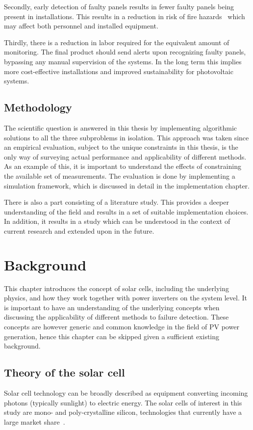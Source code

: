 Secondly, early detection of faulty panels results in fewer faulty panels being present in installations.
This results in a reduction in risk of fire hazards~\cite{Zhao2010night} which may affect both personnel and installed equipment.

Thirdly, there is a reduction in labor required for the equivalent amount of monitoring.
The final product should send alerts upon recognizing faulty panels, bypassing any manual supervision of the systems.
In the long term this implies more cost-effective installations and improved sustainability for photovoltaic systems.

\section{Methodology}
The scientific question is answered in this thesis by implementing algorithmic solutions to all the three subproblems in isolation.
This approach was taken since an empirical evaluation, subject to the unique constraints in this thesis, is the only way of surveying actual performance and applicability of different methods.
As an example of this, it is important to understand the effects of constraining the available set of measurements.
The evaluation is done by implementing a simulation framework, which is discussed in detail in the implementation chapter.

There is also a part consisting of a literature study.
This provides a deeper understanding of the field and results in a set of suitable implementation choices.
In addition, it results in a study which can be understood in the context of current research and extended upon in the future.

\chapter{Background}
This chapter introduces the concept of solar cells, including the underlying physics,
and how they work together with power inverters on the system level.
It is important to have an understanding of the underlying concepts when discussing the applicability of different methods to failure detection.
These concepts are however generic and common knowledge in the field of PV power generation, 
hence this chapter can be skipped given a sufficient existing background.

\section{Theory of the solar cell}
Solar cell technology can be broadly described as equipment converting incoming photons (typically sunlight) to electric energy.
The solar cells of interest in this study are mono- and poly-crystalline silicon, technologies that currently have a large market share~\cite{Zhao2010thesis}.

